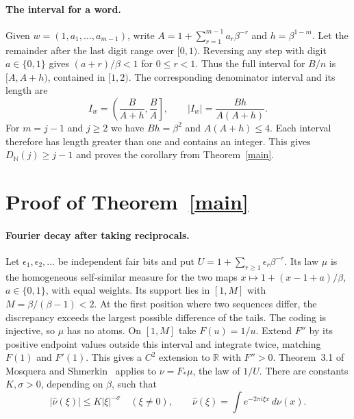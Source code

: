 \documentclass[11pt,a4paper]{article}
\newcommand{\DN}{D_{\mathbb N}}
\begin{document}
\paragraph{The interval for a word.}
Given $w=(1,a_1,\dots,a_{m-1})$, write
$A=1+\sum_{r=1}^{m-1}a_r\beta^{-r}$ and $h=\beta^{1-m}$.
Let the remainder after the last digit range over $[0,1)$. Reversing any
step with digit $a\in\{0,1\}$ gives $(a+r)/\beta<1$ for $0\le r<1$.
Thus the full interval for $B/n$ is $[A,A+h)$, contained in $[1,2)$.
The corresponding denominator interval and its length are
\begin{equation}\label{window}
 I_w=\left(\frac{B}{A+h},\frac{B}{A}\right],\qquad
 |I_w|=\frac{Bh}{A(A+h)}.
\end{equation}
For $m=j-1$ and $j\ge2$ we have $Bh=\beta^2$ and $A(A+h)\le4$.
Each interval therefore has length greater than one and contains an
integer. This gives $\DN(j)\ge j-1$ and proves the corollary from
Theorem~\ref{main}.

\section{Proof of Theorem~\ref{main}}
\paragraph{Fourier decay after taking reciprocals.}
Let $\epsilon_1,\epsilon_2,\dots$ be independent fair bits and put
$U=1+\sum_{r\ge1}\epsilon_r\beta^{-r}$. Its law $\mu$ is the homogeneous
self-similar measure for the two maps $x\mapsto 1+(x-1+a)/\beta$,
$a\in\{0,1\}$, with equal weights. Its support lies in $[1,M]$ with
$M=\beta/(\beta-1)<2$. At the first position where two sequences differ,
the discrepancy exceeds the largest possible difference of the tails.
The coding is injective, so $\mu$ has no atoms. On $[1,M]$ take
$F(u)=1/u$. Extend $F''$ by its positive endpoint values outside this
interval and integrate twice, matching $F(1)$ and $F'(1)$. This gives a
$C^2$ extension to $\mathbb R$ with $F''>0$. Theorem~3.1 of Mosquera and
Shmerkin~\cite{ms} applies to $\nu=F_*\mu$, the law of $1/U$. There
are constants $K,\sigma>0$, depending on $\beta$, such that
\[
 |\widehat\nu(\xi)|\le K|\xi|^{-\sigma}\quad(\xi\ne0),\qquad
 \widehat\nu(\xi)=\int e^{-2\pi i\xi x}\,d\nu(x).
\]
\end{document}
